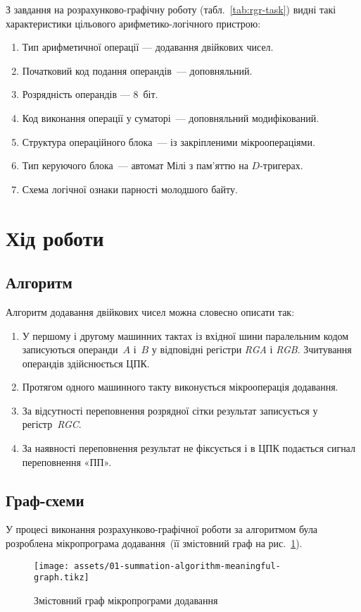 \documentclass[a4paper,oneside,DIV=12,12pt]{scrartcl}
\newcommand\schel[1]{\textit{#1}}
\begin{document}
		З завдання на розрахунково-графічну роботу (табл.~\ref{tab:rgr-task}) видні такі характеристики цільового арифметико-логічного пристрою:
		\begin{enumerate}
			\item Тип арифметичної операції — додавання двійкових чисел.
			\item Початковий код подання операндів~— доповняльний.
			\item Розрядність операндів — 8~біт.
			\item Код виконання операції у суматорі~— доповняльний модифікований.
			\item Структура операційного блока~— із закріпленими мікроопераціями.
			\item Тип керуючого блока~— автомат Мілі з пам'яттю на $D$-тригерах.
			\item Схема логічної ознаки парності молодшого байту.
		\end{enumerate}
		
	\section{Хід роботи}
		\subsection{Алгоритм}
			Алгоритм додавання двійкових чисел можна словесно описати так:
			\begin{enumerate}
				\item У першому і другому машинних тактах із вхідної шини паралельним кодом записуються операнди~$A$ і~$B$ у відповідні регістри \schel{RGA} і \schel{RGB}. Зчитування операндів здійснюється ЦПК.
				\item Протягом одного машинного такту виконується мікрооперація додавання.
				\item За відсутності переповнення розрядної сітки результат записується у регістр~\schel{RGC}.
				\item За наявності переповнення результат не фіксується і в ЦПК подається сигнал переповнення «ПП».
			\end{enumerate}
			
		\subsection{Граф-схеми}
			У процесі виконання розрахунково-графічної роботи за алгоритмом була розроблена мікропрограма додавання~(її змістовний граф на рис.~\ref{fig:summation-algorithm-meaningful-graph}).
			\begin{figure}[!htbp]
			\centering
				\texttt{[image: assets/01-summation-algorithm-meaningful-graph.tikz]}
			\caption{Змістовний граф мікропрограми додавання}
			\label{fig:summation-algorithm-meaningful-graph}
			\end{figure}
			
\end{document}
